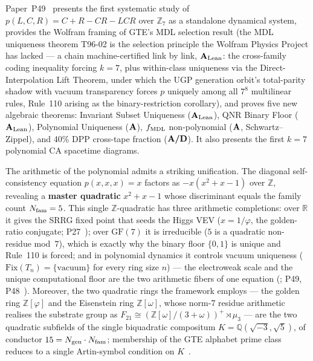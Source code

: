 Paper~P49~\cite{SpivackGTEPolynomialWolfram} presents the first systematic study of
$p(L,C,R) = C+R-CR-LCR$ over $\mathbb{Z}_7$ as a standalone dynamical system,
provides the Wolfram framing of GTE's MDL selection result (the MDL uniqueness
theorem T96-02 is the selection principle the Wolfram Physics Project has lacked
--- a chain machine-certified link by link, $\textbf{A}_{\rm Lean}$: the cross-family coding
inequality forcing $k=7$, plus within-class uniqueness via the
Direct-Interpolation Lift Theorem, under which the UGP generation orbit's
total-parity shadow with vacuum transparency forces $p$ uniquely among all $7^8$
multilinear rules, Rule~110 arising as the binary-restriction corollary),
and proves five new algebraic theorems: Invariant Subset Uniqueness ($\textbf{A}_{\rm Lean}$),
QNR Binary Floor ($\textbf{A}_{\rm Lean}$), Polynomial Uniqueness ($\textbf{A}$), $f_{\rm MDL}$
non-polynomial ($\textbf{A}$, Schwartz--Zippel), and 40\% DPP cross-tape fraction ($\textbf{A/D}$).
It also presents the first $k=7$ polynomial CA spacetime diagrams.

The arithmetic of the polynomial admits a striking unification.  The diagonal
self-consistency equation $p(x,x,x) = x$ factors as $-x(x^2+x-1)$ over
$\mathbb{Z}$, revealing a \textbf{master quadratic} $x^2+x-1$ whose discriminant
equals the family count $N_{\rm fam} = 5$.  This single $\mathbb{Z}$-quadratic has
three arithmetic completions: over $\mathbb{R}$ it gives the SRRG fixed point that
seeds the Higgs VEV ($x = 1/\varphi$, the golden-ratio conjugate;
P27~\cite{SpivackSRRG}); over $\mathrm{GF}(7)$ it is irreducible ($5$ is a
quadratic non-residue mod~$7$), which is exactly why the binary floor $\{0,1\}$ is
unique and Rule~110 is forced; and in polynomial dynamics it controls vacuum
uniqueness ($\mathrm{Fix}(T_n) = \{\text{vacuum}\}$ for every ring size $n$) ---
the electroweak scale and the unique computational floor are the two arithmetic
fibers of one equation (\CatAL;
P49, P48~\cite{SpivackGTEPolynomialWolfram,SpivackGTECompleteFramework}).
Moreover, the two quadratic rings the framework employs --- the golden ring
$\mathbb{Z}[\varphi]$ and the Eisenstein ring $\mathbb{Z}[\omega]$, whose norm-7
residue arithmetic realises the substrate group as
$F_{21} \cong (\mathbb{Z}[\omega]/(3+\omega))^+ \rtimes \mu_3$ --- are the two
quadratic subfields of the single biquadratic compositum
$K = \mathbb{Q}(\sqrt{-3},\sqrt{5})$, of conductor
$15 = N_{\rm gen}\cdot N_{\rm fam}$; membership of the GTE alphabet prime class
reduces to a single Artin-symbol condition on
$K$~\cite{SpivackGTEPolynomialWolfram}.

